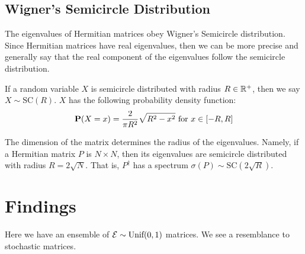 
\newpage
\subsection{Wigner's Semicircle Distribution}

The eigenvalues of Hermitian matrices obey Wigner's Semicircle distribution. Since Hermitian matrices have real eigenvalues, then we can be more precise and generally say that the real component of the eigenvalues follow the semicircle distribution.

\begin{definition}
If a random variable $X$ is semicircle distributed with radius $R \in \mathbb{R}^+$, then we say $X \sim \text{SC}(R)$. $X$ has the following probability density function:
$$\textbf{P}(X = x) = \frac{2}{\pi R^2} \sqrt{R^2 - x^2} \text{ for } x \in [-R, R]$$
\end{definition}

\begin{remark}
The dimension of the matrix determines the radius of the eigenvalues. Namely, if a Hermitian matrix $P$ is $N \times N$, then its eigenvalues are semicircle distributed with radius $R = 2\sqrt{N}$. That is, $P^{\dagger}$ has a spectrum $\sigma({P}) \sim \text{SC}(2\sqrt{R})$.
\end{remark}


\newpage
\section{Findings}

Here we have an ensemble of $\mathcal{E} \sim \text{Unif}(0,1)$ matrices. We see a resemblance to
stochastic matrices.

\newpage

